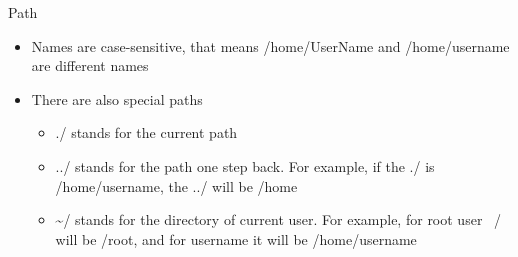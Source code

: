 \documentclass[usenames,dvipsnames,10pt,aspectratio=169]{beamer}
\begin{document}
\begin{frame}{Path}
    \begin{itemize}
        \item Names are case-sensitive, that means {\color{ucugreen} /home/UserName} and {\color{ucugreen} /home/username} are different names
        \item There are also special paths
        \begin{itemize}
            \item {\color{ucugreen} ./} stands for the current path
            \item {\color{ucugreen} ../} stands for the path one step back. For example, if the {\color{ucugreen} ./} is {\color{ucugreen} /home/username}, the {\color{ucugreen} ../} will be {\color{ucugreen} /home}
            \item {\color{ucugreen} \textasciitilde /} stands for the directory of current user. For example, for {\color{ucugreen} root} user {\color{ucugreen} ~/} will be {\color{ucugreen} /root}, and for {\color{ucugreen} username} it will be {\color{ucugreen} /home/username}
        \end{itemize}
    \end{itemize}
\end{frame}


\end{document}
